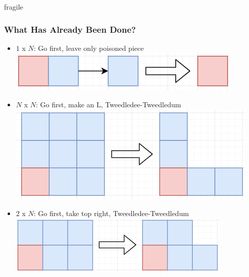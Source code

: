 \documentclass[aspectratio=169,usenames,dvipsnames]{beamer}
\begin{document}
\begin{frame}{fragile}
    \frametitle{What Has Already Been Done?}

    \begin{itemize}
        \item $1$ x $N$: Go first, leave only poisoned piece\\
        \includegraphics[scale=.5]{1 x N key.png}
        \item $N$ x $N$: Go first, make an L, Tweedledee-Tweedledum\\
        \includegraphics[scale=.5]{N x N key.png}
        \item $2$ x $N$: Go first, take top right, Tweedledee-Tweedledum\\
        \includegraphics[scale=.5]{2 x N key.png}
    \end{itemize}
\end{frame}
\end{document}

